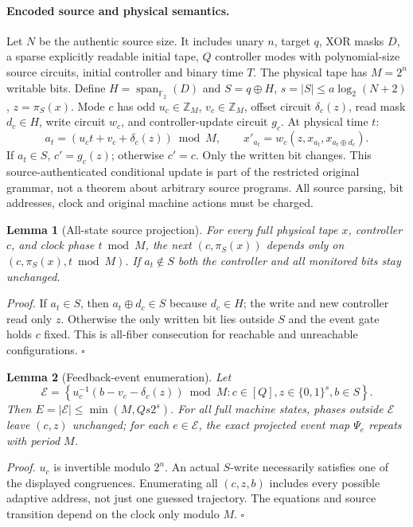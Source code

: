 \documentclass[11pt]{article}
\newtheorem{lemma}{Lemma}
\begin{document}
\paragraph{Encoded source and physical semantics.} Let $N$ be the authentic source size. It includes unary $n$, target $q$, XOR masks $D$, a sparse explicitly readable initial tape, $Q$ controller modes with polynomial-size source circuits, initial controller and binary time $T$. The physical tape has $M=2^n$ writable bits. Define $H=\operatorname{span}_{\mathbb F_2}(D)$ and $S=q\oplus H$, $s=|S|\le a\log_2(N+2)$, $z=\pi_S(x)$. Mode $c$ has odd $u_c\in\mathbb Z_M$, $v_c\in\mathbb Z_M$, offset circuit $\delta_c(z)$, read mask $d_c\in H$, write circuit $w_c$, and controller-update circuit $g_c$. At physical time $t$:
\[
a_t=(u_ct+v_c+\delta_c(z))\bmod M,\qquad
x'_{a_t}=w_c(z,x_{a_t},x_{a_t\oplus d_c}).
\]
If $a_t\in S$, $c'=g_c(z)$; otherwise $c'=c$. Only the written bit changes. This source-authenticated conditional update is part of the restricted original grammar, not a theorem about arbitrary source programs. All source parsing, bit addresses, clock and original machine actions must be charged.
\begin{lemma}[All-state source projection]
For every full physical tape $x$, controller $c$, and clock phase $t\bmod M$, the next $(c,\pi_S(x))$ depends only on $(c,\pi_S(x),t\bmod M)$. If $a_t\notin S$ both the controller and all monitored bits stay unchanged.
\end{lemma}
\noindent\emph{Proof.} If $a_t\in S$, then $a_t\oplus d_c\in S$ because $d_c\in H$; the write and new controller read only $z$. Otherwise the only written bit lies outside $S$ and the event gate holds $c$ fixed. This is all-fiber consecution for reachable and unreachable configurations. \(\square\)
\begin{lemma}[Feedback-event enumeration]
Let
\[
\mathcal E=\left\{u_c^{-1}(b-v_c-\delta_c(z))\bmod M:
c\in[Q],z\in\{0,1\}^s,b\in S\right\}.
\]
Then $E=|\mathcal E|\le\min(M,Qs2^s)$. For all full machine states, phases outside $\mathcal E$ leave $(c,z)$ unchanged; for each $e\in\mathcal E$, the exact projected event map $\Psi_e$ repeats with period $M$.
\end{lemma}
\noindent\emph{Proof.} $u_c$ is invertible modulo $2^n$. An actual $S$-write necessarily satisfies one of the displayed congruences. Enumerating all $(c,z,b)$ includes every possible adaptive address, not just one guessed trajectory. The equations and source transition depend on the clock only modulo $M$. \(\square\)
\end{document}
